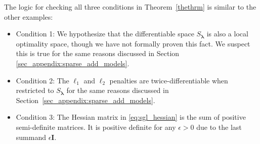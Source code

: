 \documentclass[12pt,letterpaper]{article}
\begin{document}
The logic for checking all three conditions in Theorem~\ref{thethrm} is similar to the other examples:
\begin{itemize}
	\item[] Condition 1: We hypothesize that the differentiable space $S_{\boldsymbol{\lambda}}$ is also a local optimality space, though we have not formally proven this fact. We suspect this is true for the same reasons discussed in Section \ref{sec_appendix:sparse_add_models}.
	\item[] Condition 2: The $\ell_1$ and $\ell_2$ penalties are twice-differentiable when restricted to $S_{\boldsymbol{\lambda}}$ for the same reasons discussed in Section~\ref{sec_appendix:sparse_add_models}. 
	\item[] Condition 3: The Hessian matrix in \eqref{eq:sgl_hessian} is the sum of positive semi-definite matrices. It is positive definite for any $\epsilon > 0$ due to the last summand $\epsilon \boldsymbol{I}$. 
\end{itemize}
\end{document}
